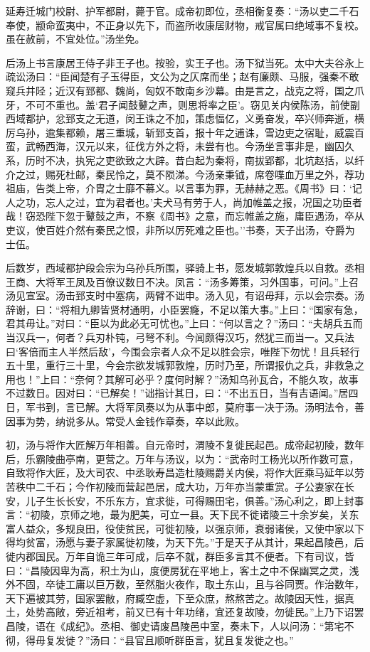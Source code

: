 \documentclass[]{article}
\begin{document}
延寿迁城门校尉、护军都尉，薨于官。成帝初即位，丞相衡复奏：``汤以吏二千石奉使，颛命蛮夷中，不正身以先下，而盗所收康居财物，戒官属曰绝域事不复校。虽在赦前，不宜处位。''汤坐免。

后汤上书言康居王侍子非王子也。按验，实王子也。汤下狱当死。太中大夫谷永上疏讼汤曰：``臣闻楚有子玉得臣，文公为之仄席而坐；赵有廉颇、马服，强秦不敢窥兵井陉；近汉有郅都、魏尚，匈奴不敢南乡沙幕。由是言之，战克之将，国之爪牙，不可不重也。盖`君子闻鼓鼙之声，则思将率之臣'。窃见关内侯陈汤，前使副西域都护，忿郅支之无道，闵王诛之不加，策虑愊亿，义勇奋发，卒兴师奔逝，横厉乌孙，逾集都赖，屠三重城，斩郅支首，报十年之逋诛，雪边吏之宿耻，威震百蛮，武畅西海，汉元以来，征伐方外之将，未尝有也。今汤坐言事非是，幽囚久系，历时不决，执宪之吏欲致之大辟。昔白起为秦将，南拔郢都，北坑赵括，以纤介之过，赐死杜邮，秦民怜之，莫不陨涕。今汤亲秉钺，席卷喋血万里之外，荐功祖庙，告类上帝，介胄之士靡不慕义。以言事为罪，无赫赫之恶。《周书》曰：`记人之功，忘人之过，宜为君者也。'夫犬马有劳于人，尚加帷盖之报，况国之功臣者哉！窃恐陛下忽于鼙鼓之声，不察《周书》之意，而忘帷盖之施，庸臣遇汤，卒从吏议，使百姓介然有秦民之恨，非所以厉死难之臣也。''书奏，天子出汤，夺爵为士伍。

后数岁，西域都护段会宗为乌孙兵所围，驿骑上书，愿发城郭敦煌兵以自救。丞相王商、大将军王凤及百僚议数日不决。凤言：``汤多筹策，习外国事，可问。''上召汤见宣室。汤击郅支时中塞病，两臂不诎申。汤入见，有诏毋拜，示以会宗奏。汤辞谢，曰：``将相九卿皆贤材通明，小臣罢癃，不足以策大事。''上曰：``国家有急，君其毋让。''对曰：``臣以为此必无可忧也。''上曰：``何以言之？''汤曰：``夫胡兵五而当汉兵一，何者？兵刃朴钝，弓弩不利。今闻颇得汉巧，然犹三而当一。又兵法曰`客倍而主人半然后敌'，今围会宗者人众不足以胜会宗，唯陛下勿忧！且兵轻行五十里，重行三十里，今会宗欲发城郭敦煌，历时乃至，所谓报仇之兵，非救急之用也！''上曰：``奈何？其解可必乎？度何时解？''汤知乌孙瓦合，不能久攻，故事不过数日。因对曰：``已解矣！''诎指计其日，曰：``不出五日，当有吉语闻。''居四日，军书到，言已解。大将军凤奏以为从事中郎，莫府事一决于汤。汤明法令，善因事为势，纳说多从。常受人金钱作章奏，卒以此败。

初，汤与将作大匠解万年相善。自元帝时，渭陵不复徙民起邑。成帝起初陵，数年后，乐霸陵曲亭南，更营之。万年与汤议，以为：``武帝时工杨光以所作数可意，自致将作大匠，及大司农、中丞耿寿昌造杜陵赐爵关内侯，将作大匠乘马延年以劳苦秩中二千石；今作初陵而营起邑居，成大功，万年亦当蒙重赏。子公妻家在长安，儿子生长长安，不乐东方，宜求徙，可得赐田宅，俱善。''汤心利之，即上封事言：``初陵，京师之地，最为肥美，可立一县。天下民不徙诸陵三十余岁矣，关东富人益众，多规良田，役使贫民，可徙初陵，以强京师，衰弱诸侯，又使中家以下得均贫富，汤愿与妻子家属徙初陵，为天下先。''于是天子从其计，果起昌陵邑，后徙内郡国民。万年自诡三年可成，后卒不就，群臣多言其不便者。下有司议，皆曰：``昌陵因卑为高，积土为山，度便房犹在平地上，客土之中不保幽冥之灵，浅外不固，卒徒工庸以巨万数，至然脂火夜作，取土东山，且与谷同贾。作治数年，天下遍被其劳，国家罢敝，府臧空虚，下至众庶，熬熬苦之。故陵因天性，据真土，处势高敞，旁近祖考，前又已有十年功绪，宜还复故陵，勿徙民。''上乃下诏罢昌陵，语在《成纪》。丞相、御史请废昌陵邑中室，奏未下，人以问汤：``第宅不彻，得毋复发徙？''汤曰：``县官且顺听群臣言，犹且复发徙之也。''
\end{document}
